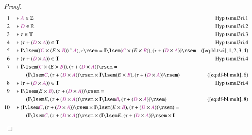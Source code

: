 \begin{proof}
\begin{align}
  1 &&  & \vdash \mc{A} \in
      \mathbb{Z}&\text{Hyp~tsmul3ri.1}\notag%
  \\ 2 &&  & \vdash \mc{D} \in
      \mathbb{R}&\text{Hyp~tsmul3ri.2}\notag%
  \\ 3 &&  & \vdash \tau \in
      \mathbf{T}&\text{Hyp~tsmul3ri.3}\notag%
  \\ 4 &&  & \vdash ( \tau + ( \mc{D} \times \mc{A} ) ) \in
      \mathbf{T}&\text{Hyp~tsmul3ri.4}\notag%
  \\ 5 &&  & \vdash \mathbf{I} \lsem ( ( \mc{C} \times ( E \times \mc{B} ) )
      ~\string^~ \mc{A} ) , \tau \rsem = \mathbf{I} \lsem (
      \mc{C} \times ( E \times \mc{B} ) ) , ( \tau + ( \mc{D}
      \times \mc{A} ) )
      \rsem&(\mbox{\ref{eq:bl.tsci}},1,2,3,4)\notag
  \\ 6 &&  & \vdash ( \tau + ( \mc{D} \times \mc{A} ) ) \in
      \mathbf{T}&\text{Hyp~tsmul3ri.4}\notag%
  \\ 7 &&  & \vdash \mathbf{I} \lsem ( \mc{C} \times ( E \times \mc{B} ) ) , (
      \tau + ( \mc{D} \times \mc{A} ) ) \rsem =  \notag \\ & & & \qquad
     ( \mathbf{I}
      \lsem \mc{C} , ( \tau + ( \mc{D} \times \mc{A} ) )
      \rsem \times \mathbf{I} \lsem ( E \times \mc{B} ) , (
      \tau + ( \mc{D} \times \mc{A} ) ) \rsem
      )&(\mbox{\ref{eq:df-bl.mult}},6)\notag
  \\ 8 &&  & \vdash ( \tau + ( \mc{D} \times \mc{A} ) ) \in
      \mathbf{T}&\text{Hyp~tsmul3ri.4}\notag%
  \\ 9 &&  & \vdash \mathbf{I} \lsem ( E \times \mc{B} ) , ( \tau + ( \mc{D}
      \times \mc{A} ) ) \rsem =  \notag \\ & & & \qquad
     ( \mathbf{I} \lsem E , (
      \tau + ( \mc{D} \times \mc{A} ) ) \rsem \times
      \mathbf{I} \lsem \mc{B} , ( \tau + ( \mc{D} \times
      \mc{A} ) ) \rsem
      )&(\mbox{\ref{eq:df-bl.mult}},8)\notag
  \\ 10 &&  & \vdash ( \mathbf{I} \lsem \mc{C} , ( \tau + ( \mc{D} \times \mc{A}
      ) ) \rsem \times \mathbf{I} \lsem ( E \times \mc{B} ) ,
      ( \tau + ( \mc{D} \times \mc{A} ) ) \rsem ) =  \notag \\ & & & \qquad
     (
      \mathbf{I} \lsem \mc{C} , ( \tau + ( \mc{D} \times
      \mc{A} ) ) \rsem \times ( \mathbf{I} \lsem E , ( \tau
      + ( \mc{D} \times \mc{A} ) ) \rsem \times \mathbf{I}

\end{align}
\end{proof}

